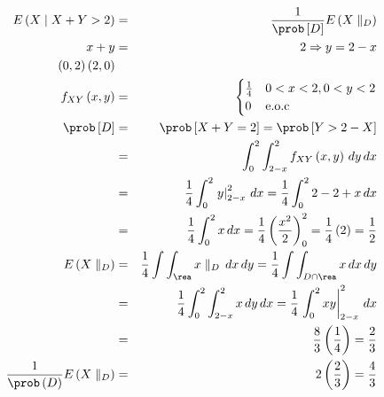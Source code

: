 \begin{enumerate}
\begin{eqnarray*}
E \left(X \mid X+Y>2\right) &=& \frac{1}{\prob \left[D \right] } E \left(X \parallel _{D} \right)\\
x+y &=& 2 \Rightarrow y=2-x\\
\left(0,2 \right) \left(2,0 \right)\\
f_{XY} \left(x,y \right)&=& \begin{cases}
\frac{1}{4} & 0<x<2 , 0<y<2\\
0 & \textrm{e.o.c}
\end{cases}\\
\prob \left[D \right] &=& \prob \left[X+Y=2 \right] = \prob \left[ Y >2 -X\right]\\
&=& \int _{0}^{2} \int_{2-x}^{2} f_{XY} \left(x,y \right) \, dy\,dx\\
&=&\frac{1}{4} \int _{0}^{2} \left. y \right|_{2-x}^{2} \, dx = \frac{1}{4} \int _{0}^{2} 2-2+x \, dx\\
&=& \frac{1}{4} \int_{0}^{2} x \, dx = \frac{1}{4} \left(\frac{x^2}{2} \right)_{0}^{2}= \frac{1}{4} \left(2 \right) = \frac{1}{2}\\
E \left( X \parallel _{D} \right)&=& \frac{1}{4} \int \int_{\rea}  x \parallel_{D}
\, dx\, dy = \frac{1}{4} \int \int_{D\cap\rea} x \, dx\, dy\\
 &=&\frac{1}{4} \int_{0}^{2} \int_{2-x}^{2}  x  \, dy\, dx = \frac{1}{4}\left.  \int_{0}^{2} xy \right|_{2-x}^{2} \, dx\\
 &=& \frac{8}{3} \left(\frac{1}{4} \right)= \frac{2}{3}\\
 \frac{1}{\prob \left(D \right)}E \left(X\parallel _{D} \right) &=& 2 \left(\frac{2}{3} \right)= \frac{4}{3}
 \end{eqnarray*}


\end{enumerate}
